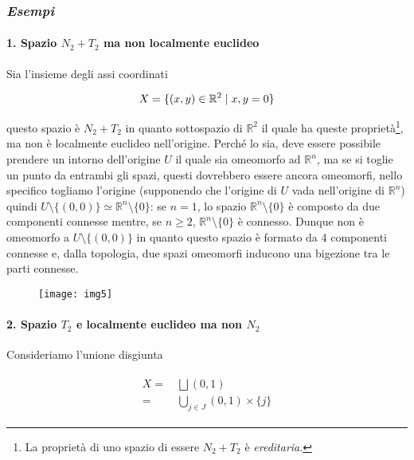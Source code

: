 \subsubsection{\textit{Esempi}}

\paragraph{1. Spazio $ N_{2} + T_{2} $ ma non localmente euclideo} 

Sia l'insieme degli assi coordinati

\begin{equation}
	X = \{ (x,y) \in \mathbb{R}^{2} \mid x,y = 0 \}
\end{equation}

questo spazio è $ N_{2} + T_{2} $ in quanto sottospazio di $ \mathbb{R}^{2} $ il quale ha queste proprietà\footnote{%
	La proprietà di uno spazio di essere $ N_{2} + T_{2} $ è \textit{ereditaria}.%
}, ma non è localmente euclideo nell'origine. Perché lo sia, deve essere possibile prendere un intorno dell'origine $ U $ il quale sia omeomorfo ad $ \mathbb{R}^{n} $, ma se si toglie un punto da entrambi gli spazi, questi dovrebbero essere ancora omeomorfi, nello specifico togliamo l'origine (supponendo che l'origine di $ U $ vada nell'origine di $ \mathbb{R}^{n} $) quindi $ U \setminus \{(0,0)\} \simeq \mathbb{R}^{n} \setminus \{0\} $: se $ n=1 $, lo spazio $ \mathbb{R}^{n} \setminus \{0\} $ è composto da due componenti connesse mentre, se $ n \geqslant 2 $, $ \mathbb{R}^{n} \setminus \{0\} $ è connesso. Dunque non è omeomorfo a $ U \setminus \{(0,0)\} $ in quanto questo spazio è formato da 4 componenti connesse e, dalla topologia, due spazi omeomorfi inducono una bigezione tra le parti connesse.

\begin{figure}[H]
	\centering
	\texttt{[image: img5]}
\end{figure}

\paragraph{2. Spazio $ T_{2} $ e localmente euclideo ma non $ N_{2} $}

Consideriamo l'unione disgiunta

\begin{align}
	\begin{split}
		X =& \, \bigsqcup (0,1)\\
		=& \, \bigcup_{j \in J} (0,1) \times \{j\}
	\end{split}
\end{align}

